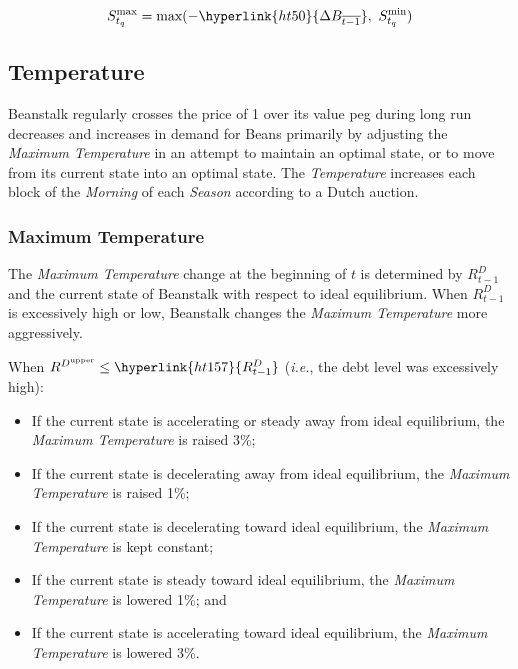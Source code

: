 \documentclass[tikz]{article}
\newcommand{\term}[1]{\textsl{#1}}
\newcommand{\Bean}{} %
\begin{document}
$$S_{t_q}^{\text{max}} = \text{max}(-\hyperlink{ht50}{\Delta B_{\overline{t-1}}},\ S_{t_q}^{\text{min}})$$

\subsection{Temperature}
Beanstalk regularly crosses the price of \Bean1 over its value peg during long run decreases and increases in demand for Beans primarily by adjusting the \term{Maximum Temperature} in an attempt to maintain an optimal state, or to move from its current state into an optimal state. The \term{Temperature} increases each block of the \term{Morning} of each \term{Season} according to a Dutch auction. 

\subsubsection{Maximum Temperature}
The \term{Maximum Temperature} change at the beginning of $t$ is determined by $R^D_{t-1}$ and the current state of Beanstalk with respect to ideal equilibrium. When $R^D_{t-1}$ is excessively high or low, Beanstalk changes the \term{Maximum Temperature} more aggressively.

When $R^{D^{\text{upper}}} \leq \hyperlink{ht157}{R^D_{t-1}}$ (\term{i.e.}, the debt level was excessively high):
\begin{itemize}[midsep]
    \item If the current state is accelerating or steady away from ideal equilibrium, the \term{Maximum Temperature} is raised 3\%;
    \item If the current state is decelerating away from ideal equilibrium, the \term{Maximum Temperature} is raised 1\%;
    \item If the current state is decelerating toward ideal equilibrium, the \term{Maximum Temperature} is kept constant;
    \item If the current state is steady toward ideal equilibrium, the \term{Maximum Temperature} is lowered 1\%; and
    \item If the current state is accelerating toward ideal equilibrium, the \term{Maximum Temperature} is lowered 3\%.
\end{itemize}

\newpage
\end{document}
